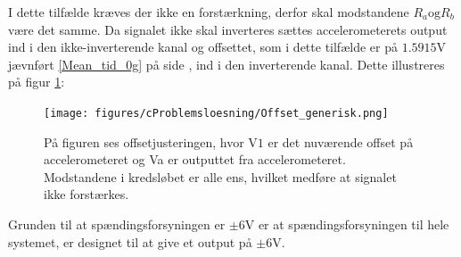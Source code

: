 I dette tilfælde kræves der ikke en forstærkning, derfor skal modstandene $R_a \text{og} R_b$ være det samme. Da signalet ikke skal inverteres sættes accelerometerets output ind i den ikke-inverterende kanal og offsettet, som i dette tilfælde er på $1.5915$V jævnført  \ref{Mean_tid_0g} på side \pageref{Mean_tid_0g}, ind i den inverterende kanal. Dette illustreres på figur \ref{fig:Offset_generisk}:
\begin{figure}[H]
\centering
\texttt{[image: figures/cProblemsloesning/Offset\_generisk.png]}
\caption{På figuren ses offsetjusteringen, hvor V$1$ er det nuværende offset på accelerometeret og Va er outputtet fra accelerometeret. Modstandene i kredsløbet er alle ens, hvilket medføre at signalet ikke forstærkes.}
\label{fig:Offset_generisk}
\end{figure}

Grunden til at spændingsforsyningen er $\pm 6$V er at spændingsforsyningen til hele systemet, er designet til at give et output på $\pm 6$V. 
